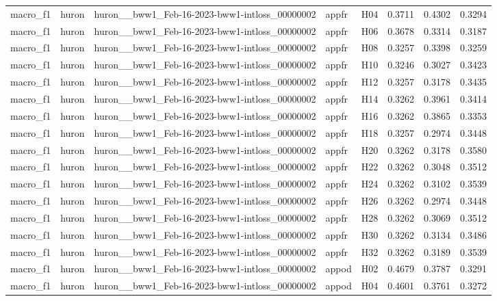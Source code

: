 \begin{table}[tbp]
\begin{tabular}{lllllrrr}
macro\_f1 & huron & huron\_\_bww1\_Feb-16-2023-bww1-intloss\_00000002 & appfr & H04 & 0.3711 & 0.4302 & 0.3294 \\
macro\_f1 & huron & huron\_\_bww1\_Feb-16-2023-bww1-intloss\_00000002 & appfr & H06 & 0.3678 & 0.3314 & 0.3187 \\
macro\_f1 & huron & huron\_\_bww1\_Feb-16-2023-bww1-intloss\_00000002 & appfr & H08 & 0.3257 & 0.3398 & 0.3259 \\
macro\_f1 & huron & huron\_\_bww1\_Feb-16-2023-bww1-intloss\_00000002 & appfr & H10 & 0.3246 & 0.3027 & 0.3423 \\
macro\_f1 & huron & huron\_\_bww1\_Feb-16-2023-bww1-intloss\_00000002 & appfr & H12 & 0.3257 & 0.3178 & 0.3435 \\
macro\_f1 & huron & huron\_\_bww1\_Feb-16-2023-bww1-intloss\_00000002 & appfr & H14 & 0.3262 & 0.3961 & 0.3414 \\
macro\_f1 & huron & huron\_\_bww1\_Feb-16-2023-bww1-intloss\_00000002 & appfr & H16 & 0.3262 & 0.3865 & 0.3353 \\
macro\_f1 & huron & huron\_\_bww1\_Feb-16-2023-bww1-intloss\_00000002 & appfr & H18 & 0.3257 & 0.2974 & 0.3448 \\
macro\_f1 & huron & huron\_\_bww1\_Feb-16-2023-bww1-intloss\_00000002 & appfr & H20 & 0.3262 & 0.3178 & 0.3580 \\
macro\_f1 & huron & huron\_\_bww1\_Feb-16-2023-bww1-intloss\_00000002 & appfr & H22 & 0.3262 & 0.3048 & 0.3512 \\
macro\_f1 & huron & huron\_\_bww1\_Feb-16-2023-bww1-intloss\_00000002 & appfr & H24 & 0.3262 & 0.3102 & 0.3539 \\
macro\_f1 & huron & huron\_\_bww1\_Feb-16-2023-bww1-intloss\_00000002 & appfr & H26 & 0.3262 & 0.2974 & 0.3448 \\
macro\_f1 & huron & huron\_\_bww1\_Feb-16-2023-bww1-intloss\_00000002 & appfr & H28 & 0.3262 & 0.3069 & 0.3512 \\
macro\_f1 & huron & huron\_\_bww1\_Feb-16-2023-bww1-intloss\_00000002 & appfr & H30 & 0.3262 & 0.3134 & 0.3486 \\
macro\_f1 & huron & huron\_\_bww1\_Feb-16-2023-bww1-intloss\_00000002 & appfr & H32 & 0.3262 & 0.3189 & 0.3539 \\
macro\_f1 & huron & huron\_\_bww1\_Feb-16-2023-bww1-intloss\_00000002 & appod & H02 & 0.4679 & 0.3787 & 0.3291 \\
macro\_f1 & huron & huron\_\_bww1\_Feb-16-2023-bww1-intloss\_00000002 & appod & H04 & 0.4601 & 0.3761 & 0.3272 \\

\end{tabular}
\end{table}
